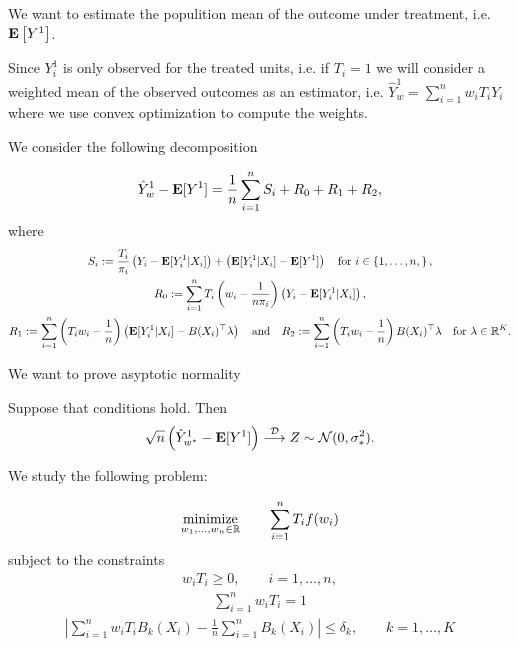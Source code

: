 We want to estimate the populition mean of the outcome under treatment,
i.e. $\mathbf{E} \left[ Y^1 \right]$.

Since $Y_i^1$ is only observed for the treated units, i.e. if $T_i = 1$
we will consider a weighted mean of the observed outcomes as an estimator, i.e. $\hat{Y}_w^1 = \sum_{i = 1}^{n} w_i T_i Y_i $
where we use convex optimization to compute the weights.

We consider the following decomposition

\begin{gather}
  \hat{Y}_w^1 - \mathbf{E} [ Y^1 ]
  =
  \frac{1}{n}
  \sum_{ i = 1 }^{n} S_i
    + R_0
    + R_1
    + R_2
    ,
\end{gather}
where
\begin{gather*}
  S_i 
  := 
  \frac{T_i}{\pi_i}
 \left( 
    Y_i - \E [ Y^1_i | X_i ]
 \right)
 +
 \left( 
    \E [ Y^1_i | X_i ] - \E [ Y^1]
 \right)
 \quad
 \text{for}\ 
 i \in \left\{ 1, \ldots, n, \right\}
 ,
 \\
  R_0
  :=
  \sum_{ i = 1 }^{n}
  T_i
    \left(  
      w_i - \frac{1}{n \pi_i}
    \right)
 \left( 
    Y_i - \E [ Y^1_i | X_i ]
 \right)
 ,\\
  R_1
  :=
  \sum_{ i = 1 }^{n}
    \left(  
      T_i
      w_i - \frac{1}{n}
    \right)
 \left( 
    \E [ Y^1_i | X_i ] - B(X_i)^\top \lambda
 \right)
 \quad
 \text{and}
 \quad
  R_2
  :=
  \sum_{ i = 1 }^{n}
    \left(  
      T_i
      w_i - \frac{1}{n}
    \right)
 B(X_i)^\top \lambda
 \quad 
 \text{for}
 \ 
 \lambda \in \R^K
 .
\end{gather*}

We want to prove asyptotic normality

\begin{ftheorem}
  Suppose that conditions hold. Then
  \begin{gather*}
    \sqrt{n} 
    \left(
      \hat{Y}_{w^*}^1 - \mathbf{E} [ Y^1 ]
    \right)
    \overset{\mathcal{D}}{\longrightarrow}
    Z \sim \mathcal{N}(0,\sigma_*^2)
    .
  \end{gather*}
\end{ftheorem}


We study the following problem:
\begin{problem}
  \begin{gather*}
    \underset{w_1, \ldots, w_n \in \mathbb{R}}{\mathrm{minimize}}
    \qquad
    \sum_{i = 1}^{n} T_i f(w_i)
  \end{gather*}
subject to the constraints
\begin{gather*}
    w_i T_i \ge 0,
    \qquad 
    i = 1, \ldots, n,
\end{gather*}
\begin{gather*}
  \sum_{ i = 1 }^{n}
    w_i T_i
  =
  1
\end{gather*}
\begin{gather*}
    \left| 
      \sum_{i = 1}^{n} w_i T_i B_k(X_i)
      - 
      \frac{1}{n} \sum_{i = 1}^{n} B_k(X_i)
    \right|
    \le 
    \delta_k,
    \qquad
    k = 1, \ldots, K
\end{gather*}
\end{problem}

